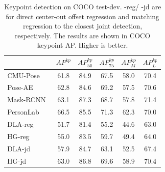 \documentclass[10pt,twocolumn,letterpaper]{article}
\begin{document}
\setlength{\tabcolsep}{2pt}
\begin{table}[t]
\centering
\begin{tabular}{l@{\ \ }c@{\ \ }c@{\ \ }c@{\ \ }c@{\ \ }c}
\hline
& $AP^{kp}$ & $AP^{kp}_{50}$ & $AP^{kp}_{75}$ & $AP^{kp}_{M}$ & $AP^{kp}_{L}$ \\
\hline
CMU-Pose~\cite{cao2017realtime} & 61.8 & 84.9 & 67.5 & 58.0 & 70.4 \\
Pose-AE~\cite{newell2017associative} & 62.8 & 84.6 & 69.2 & 57.5 & 70.6 \\
Mask-RCNN~\cite{he2017mask} & 63.1 & 87.3 & 68.7 & 57.8 & 71.4 \\
PersonLab~\cite{papandreou2018personlab} & 66.5 & 85.5 & 71.3 & 62.3 & 70.0 \\
\hline
DLA-reg & 51.7 & 81.4 & 55.2 & 44.6 & 63.0 \\
HG-reg & 55.0 & 83.5 & 59.7 & 49.4 & 64.0 \\
DLA-jd & 57.9 & 84.7 & 63.1 & 52.5 & 67.4 \\
HG-jd & 63.0 & 86.8 & 69.6 & 58.9 & 70.4 \\
\hline
\end{tabular}
\caption{Keypoint detection on COCO test-dev. -reg/ -jd are for direct center-out offset regression and matching regression to the closest joint detection, respectively. The results are shown in COCO keypoint AP. Higher is better.}
\label{table:human}
\vspace{-1em}
\end{table}
\setlength{\tabcolsep}{1.4pt}
\end{document}
